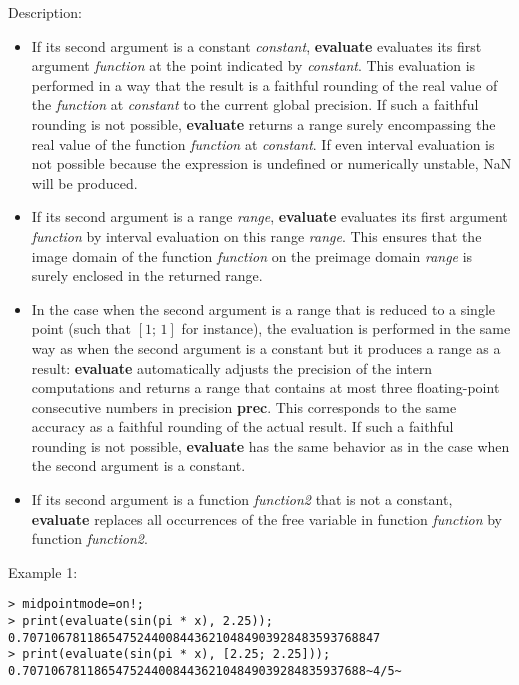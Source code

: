 \noindent Description: \begin{itemize}

\item If its second argument is a constant \emph{constant}, \textbf{evaluate} evaluates
   its first argument \emph{function} at the point indicated by
   \emph{constant}. This evaluation is performed in a way that the result is a
   faithful rounding of the real value of the \emph{function} at \emph{constant} to
   the current global precision. If such a faithful rounding is not
   possible, \textbf{evaluate} returns a range surely encompassing the real value
   of the function \emph{function} at \emph{constant}. If even interval evaluation
   is not possible because the expression is undefined or numerically
   unstable, NaN will be produced.

\item If its second argument is a range \emph{range}, \textbf{evaluate} evaluates its
   first argument \emph{function} by interval evaluation on this range
   \emph{range}. This ensures that the image domain of the function \emph{function}
   on the preimage domain \emph{range} is surely enclosed in the returned
   range.

\item In the case when the second argument is a range that is reduced to a
   single point (such that $[1;\,1]$ for instance), the evaluation
   is performed in the same way as when the second argument is a constant but
   it produces a range as a result: \textbf{evaluate} automatically adjusts the precision
   of the intern computations and returns a range that contains at most three floating-point
   consecutive numbers in precision \textbf{prec}. This corresponds to the same accuracy
   as a faithful rounding of the actual result. If such a faithful rounding
   is not possible, \textbf{evaluate} has the same behavior as in the case when the
   second argument is a constant.

\item If its second argument is a function \emph{function2} that is not a
   constant, \textbf{evaluate} replaces all occurrences of the free variable in
   function \emph{function} by function \emph{function2}.
\end{itemize}
\noindent Example 1: 
\begin{center}\begin{minipage}{15cm}\begin{Verbatim}[frame=single]
> midpointmode=on!;
> print(evaluate(sin(pi * x), 2.25));
0.70710678118654752440084436210484903928483593768847
> print(evaluate(sin(pi * x), [2.25; 2.25]));
0.707106781186547524400844362104849039284835937688~4/5~
\end{Verbatim}
\end{minipage}\end{center}

